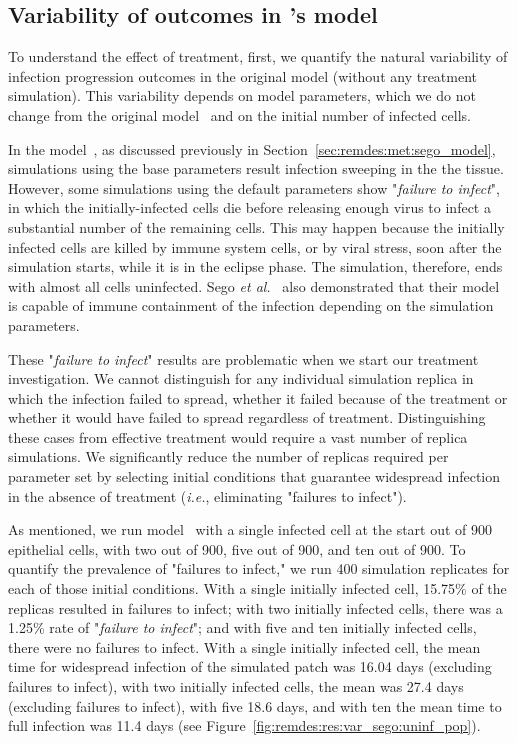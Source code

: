 \subsection{Variability of outcomes in \sags's model}\label{sec:remdes:res:var_sego}

To understand the effect of treatment, first, we quantify the natural variability of infection progression outcomes in the original model (without any treatment simulation). This variability depends on model parameters, which we do not change from the original \sags model~\cite{sego_modular_2020} and on the initial number of infected cells. 

In the \sags model~\cite{sego_modular_2020}, as discussed previously in Section~\ref{sec:remdes:met:sego_model}, simulations using the base parameters result infection sweeping in the the tissue. However, some simulations using the default parameters show "\emph{failure to infect}", in which the initially-infected cells die before releasing enough virus to infect a substantial number of the remaining cells. This may happen because the initially infected cells are killed by immune system cells, or by viral stress, soon after the simulation starts, while it is in the eclipse phase. The simulation, therefore, ends with almost all cells uninfected. Sego \emph{et al.}~\cite{sego_modular_2020} also demonstrated that their model is capable of immune containment of the infection depending on the simulation parameters.

These "\emph{failure to infect}" results are problematic when we start our treatment investigation. We cannot distinguish for any individual simulation replica in which the infection failed to spread, whether it failed because of the treatment or whether it would have failed to spread regardless of treatment. Distinguishing these cases from effective treatment would require a vast number of replica simulations. We significantly reduce the number of replicas required per parameter set by selecting initial conditions that guarantee widespread infection in the absence of treatment (\textit{i.e.}, eliminating "failures to infect").

As mentioned, we run \sags model~\cite{sego_modular_2020} with a single infected cell at the start out of 900 epithelial cells, with two out of 900, five out of 900, and ten out of 900. To quantify the prevalence of "failures to infect," we run 400 simulation replicates for each of those initial conditions. With a single initially infected cell, 15.75\% of the replicas resulted in failures to infect; with two initially infected cells, there was a 1.25\% rate of "\emph{failure to infect}"; and with five and ten initially infected cells, there were no failures to infect. With a single initially infected cell, the mean time for widespread infection of the simulated patch was 16.04 days (excluding failures to infect), with two initially infected cells, the mean was 27.4 days (excluding failures to infect), with five 18.6 days, and with ten the mean time to full infection was 11.4 days (see Figure~\ref{fig:remdes:res:var_sego:uninf_pop}). 



